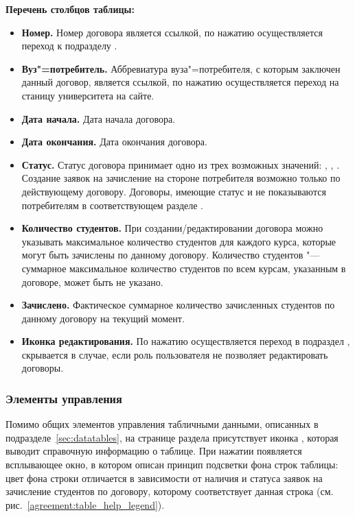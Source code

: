 \textbf{Перечень столбцов таблицы:}
\begin{itemize}
	\item \textbf{Номер.} Номер договора является ссылкой, по нажатию осуществляется переход к подразделу .
	\item \textbf{Вуз"=потребитель.} Аббревиатура вуза"=потребителя, с которым заключен данный договор, является ссылкой, по нажатию осуществляется переход на станицу университета на сайте.
	\item \textbf{Дата начала.} Дата начала договора.
	\item \textbf{Дата окончания.} Дата окончания договора.
	\item \textbf{Статус.} Статус договора принимает одно из трех возможных значений: ,  ,  . Создание заявок на зачисление на стороне потребителя возможно только по действующему договору. Договоры, имеющие статус   и  не показываются потребителям в соответствующем разделе .
	\item \textbf{Количество студентов.} При создании/редактировании договора можно указывать максимальное количество студентов для каждого курса, которые могут быть зачислены по данному договору. Количество студентов "--- суммарное максимальное количество студентов по всем курсам, указанным в договоре, может быть не указано.
	\item \textbf{Зачислено.} Фактическое суммарное количество зачисленных студентов по данному договору на текущий момент.
	\item \textbf{Иконка редактирования.} По нажатию осуществляется переход в подраздел , скрывается в случае, если роль пользователя не позволяет редактировать договоры.
\end{itemize}

\subsubsection{Элементы управления}
Помимо общих элементов управления табличными данными, описанных в подразделе~\ref{sec:datatables}, на странице раздела присутствует 
иконка  , которая выводит справочную информацию о таблице. 
При нажатии появляется всплывающее окно, в котором описан принцип подсветки фона строк таблицы: 
цвет фона строки отличается в зависимости от наличия и статуса заявок на зачисление студентов по договору, 
которому соответствует  данная строка (см. рис.~\ref{agreement:table_help_legend}).
	
